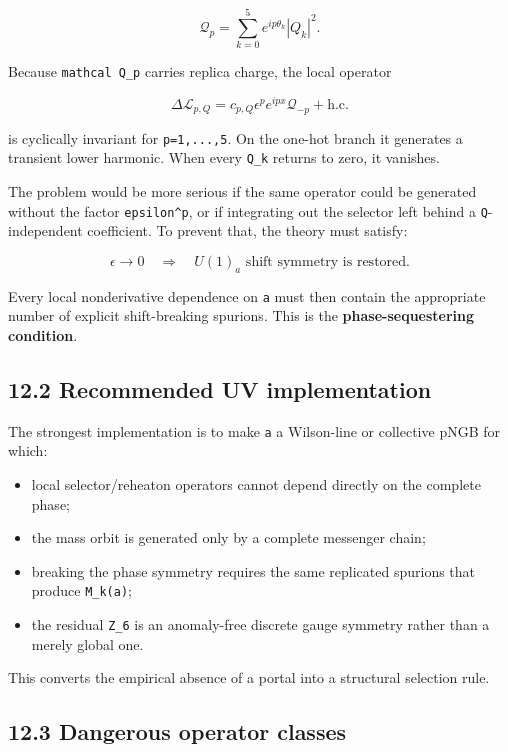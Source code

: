 \documentclass[
  10pt,
  a4paper,
]{article}
\providecommand{\tightlist}{%
  \setlength{\itemsep}{0pt}\setlength{\parskip}{0pt}}
\begin{document}
\[
\mathcal Q_p
=
\sum_{k=0}^{5}e^{ip\theta_k}|Q_k|^2.
\]

Because \texttt{mathcal\ Q\_p} carries replica charge, the local
operator

\[
\boxed{
\Delta\mathcal L_{p,Q}
=
c_{p,Q}\epsilon^p
 e^{ipx}\mathcal Q_{-p}
+\text{h.c.}
}
\]

is cyclically invariant for \texttt{p=1,...,5}. On the one-hot branch it
generates a transient lower harmonic. When every \texttt{Q\_k} returns
to zero, it vanishes.

The problem would be more serious if the same operator could be
generated without the factor \texttt{epsilon\^{}p}, or if integrating
out the selector left behind a \texttt{Q}-independent coefficient. To
prevent that, the theory must satisfy:

\[
\boxed{
\epsilon\to0
\quad\Longrightarrow\quad
U(1)_a\text{ shift symmetry is restored.}
}
\]

Every local nonderivative dependence on \texttt{a} must then contain the
appropriate number of explicit shift-breaking spurions. This is the
\textbf{phase-sequestering condition}.

\subsection{12.2 Recommended UV
implementation}\label{recommended-uv-implementation}

The strongest implementation is to make \texttt{a} a Wilson-line or
collective pNGB for which:

\begin{itemize}
\tightlist
\item
  local selector/reheaton operators cannot depend directly on the
  complete phase;
\item
  the mass orbit is generated only by a complete messenger chain;
\item
  breaking the phase symmetry requires the same replicated spurions that
  produce \texttt{M\_k(a)};
\item
  the residual \texttt{Z\_6} is an anomaly-free discrete gauge symmetry
  rather than a merely global one.
\end{itemize}

This converts the empirical absence of a portal into a structural
selection rule.

\subsection{12.3 Dangerous operator
classes}\label{dangerous-operator-classes}
\end{document}
